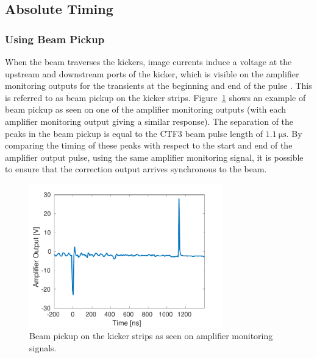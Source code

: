 \subsection{Absolute Timing}
\label{ss:absTiming}

\subsubsection{Using Beam Pickup}
\label{sss:beamPickup}

When the beam traverses the kickers, image currents induce a voltage at the upstream and downstream ports of the kicker, which is visible on the amplifier monitoring outputs for the transients at the beginning and end of the pulse \cite{byrdKicker}. This is referred to as beam pickup on the kicker strips. Figure~\ref{f:beamPickup_noKick} shows an example of beam pickup as seen on one of the amplifier monitoring outputs (with each amplifier monitoring output giving a similar response). The separation of the peaks in the beam pickup is equal to the CTF3 beam pulse length of \(1.1~\mathrm{\mu s}\). By comparing the timing of these peaks with respect to the start and end of the amplifier output pulse, using the same amplifier monitoring signal, it is possible to ensure that the correction output arrives synchronous to the beam.

\begin{figure}
  \centering
  \includegraphics[width=0.75\textwidth]{Figures/commissioning/beamPickup_noKick}
  \caption{Beam pickup on the kicker strips as seen on amplifier monitoring signals.}
  \label{f:beamPickup_noKick}
\end{figure}


